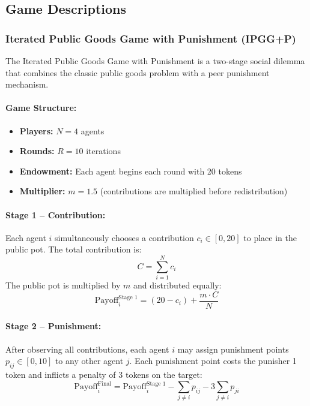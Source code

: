 

\subsection{Game Descriptions}

\subsubsection{Iterated Public Goods Game with Punishment (IPGG+P)}

The Iterated Public Goods Game with Punishment is a two-stage social dilemma that combines the classic public goods problem with a peer punishment mechanism.

\paragraph{Game Structure:}
\begin{itemize}
    \item \textbf{Players:} $N = 4$ agents
    \item \textbf{Rounds:} $R = 10$ iterations
    \item \textbf{Endowment:} Each agent begins each round with 20 tokens
    \item \textbf{Multiplier:} $m = 1.5$ (contributions are multiplied before redistribution)
\end{itemize}

\paragraph{Stage 1 -- Contribution:}
Each agent $i$ simultaneously chooses a contribution $c_i \in [0, 20]$ to place in the public pot. The total contribution is:
\[
C = \sum_{i=1}^{N} c_i
\]
The public pot is multiplied by $m$ and distributed equally:
\[
\text{Payoff}_i^{\text{Stage 1}} = (20 - c_i) + \frac{m \cdot C}{N}
\]

\paragraph{Stage 2 -- Punishment:}
After observing all contributions, each agent $i$ may assign punishment points $p_{ij} \in [0, 10]$ to any other agent $j$. Each punishment point costs the punisher 1 token and inflicts a penalty of 3 tokens on the target:
\[
\text{Payoff}_i^{\text{Final}} = \text{Payoff}_i^{\text{Stage 1}} - \sum_{j \neq i} p_{ij} - 3 \sum_{j \neq i} p_{ji}
\]

